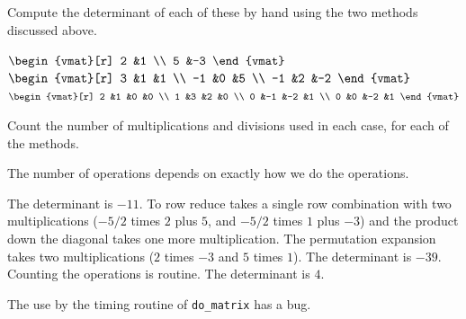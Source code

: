 \begin{exercises}
\begin{answer}
    \end{answer}
  \item 
    Compute the determinant of each of these by hand using the 
    two methods discussed above.
    \begin{exparts*}
      \partsitem $\begin{vmat}[r]
                    2  &1  \\
                    5  &-3
                  \end{vmat}$
      \partsitem $\begin{vmat}[r]
                    3  &1  &1  \\
                   -1  &0  &5  \\
                   -1  &2  &-2 
                  \end{vmat}$
      \partsitem $\begin{vmat}[r]
                    2  &1  &0  &0  \\
                    1  &3  &2  &0  \\
                    0  &-1 &-2 &1  \\
                    0  &0  &-2 &1
                  \end{vmat}$
    \end{exparts*}
    Count the number of multiplications and divisions used in each case,
    for each of the methods.
     \begin{answer}
       The number of operations depends on exactly how we do the operations.
       \begin{exparts}
         \partsitem The determinant is $-11$.
           To row reduce takes a single row combination 
           with two multiplications
           ($-5/2$ times $2$ plus $5$, and $-5/2$ times $1$ plus $-3$)
           and the product down the diagonal takes one more multiplication.
           The permutation expansion takes two multiplications ($2$ times
           $-3$ and $5$ times $1$).
         \partsitem The determinant is $-39$.
           Counting the operations is routine.
         \partsitem The determinant is $4$.
       \end{exparts}
     \end{answer}
  \item The use by the timing routine of \lstinline[style=inline]!do_matrix!   
    has a bug.

\end{exercises}
